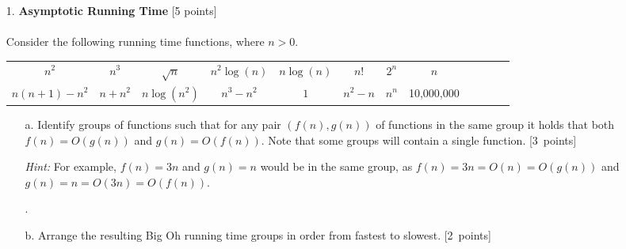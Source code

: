 \begin{enumerate}

\item[1.] \textbf{Asymptotic Running Time} [5 points]
\\
\\
Consider the following running time functions, where $n > 0$. %
\begin{center}
\begin{tabular}{ c c c c c c c c c c c c } 
 $n^{2}$ & $n^{3}$ & $\sqrt{n}$ & $n^{2}\log(n)$ & $n\log(n)$ & $n!$ & $2^{n}$ & $n$\\
 $n(n+1) - n^2$ & $n+n^{2}$ & $n\log(n^2)$ & $n^{3}-n^{2}$ & $1$ & $n^{2}-n$ & $n^n$  & 10,000,000\\ 
\end{tabular}
\end{center}
\begin{enumerate}


\item[a.] Identify groups of functions such that for any pair $(f(n),g(n))$ of functions in the same group it holds that both $f(n) = O(g(n))$ and $g(n)=O(f(n))$. Note that some groups will contain a single function. [3~points]

\emph{Hint:} For example, $f(n) = 3n$ and $g(n)=n$ would be in the same group, as $f(n) = 3n = O(n) = O(g(n))$ and $g(n) = n = O(3n) = O(f(n))$.

.\vspace{1em}
\item[b.] Arrange the resulting Big Oh running time groups in order from fastest to slowest. [2~points]


\end{enumerate}
\end{enumerate}
